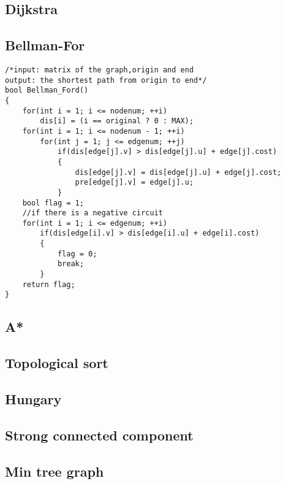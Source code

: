 \subsection{Dijkstra}
\subsection{Bellman-For}
\begin{lstlisting}
/*input: matrix of the graph,origin and end
output: the shortest path from origin to end*/
bool Bellman_Ford()  
{  
    for(int i = 1; i <= nodenum; ++i)  
        dis[i] = (i == original ? 0 : MAX);  
    for(int i = 1; i <= nodenum - 1; ++i)  
        for(int j = 1; j <= edgenum; ++j)  
            if(dis[edge[j].v] > dis[edge[j].u] + edge[j].cost)  
            {  
                dis[edge[j].v] = dis[edge[j].u] + edge[j].cost;  
                pre[edge[j].v] = edge[j].u;  
            }  
    bool flag = 1; 
    //if there is a negative circuit
    for(int i = 1; i <= edgenum; ++i)  
        if(dis[edge[i].v] > dis[edge[i].u] + edge[i].cost)  
        {  
            flag = 0;  
            break;  
        }  
    return flag;  
}
\end{lstlisting}
\subsection{A*}
\subsection{Topological sort}
\subsection{Hungary}
\subsection{Strong connected component}
\subsection{Min tree graph}
